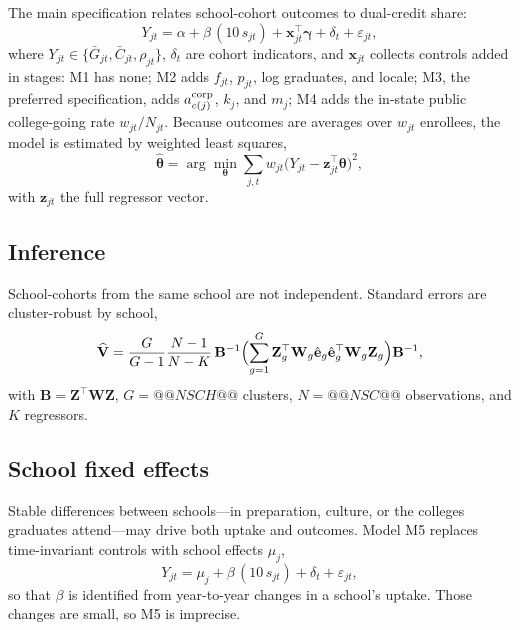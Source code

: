 \documentclass[aps,prd,reprint,superscriptaddress,nofootinbib,floatfix]{revtex4-2}
\begin{document}
The main specification relates school-cohort outcomes to dual-credit share:
\begin{equation}
Y_{jt}=\alpha+\beta\,(10\,s_{jt})+\mathbf{x}_{jt}^{\top}\boldsymbol{\gamma}+\delta_t+\varepsilon_{jt},\label{eq:main}
\end{equation}
where $Y_{jt}\in\{\bar G_{jt},\bar C_{jt},\rho_{jt}\}$, $\delta_t$ are cohort indicators, and $\mathbf{x}_{jt}$ collects controls added in stages: M1 has none; M2 adds $f_{jt}$, $p_{jt}$, log graduates, and locale; M3, the preferred specification, adds $a^{\rm corp}_{c(j)}$, $k_j$, and $m_j$; M4 adds the in-state public college-going rate $w_{jt}/N_{jt}$. Because outcomes are averages over $w_{jt}$ enrollees, the model is estimated by weighted least squares,
\begin{equation}
\hat{\boldsymbol\theta}=\arg\min_{\boldsymbol\theta}\sum_{j,t}w_{jt}\bigl(Y_{jt}-\mathbf{z}_{jt}^{\top}\boldsymbol\theta\bigr)^2,\label{eq:wls}
\end{equation}
with $\mathbf{z}_{jt}$ the full regressor vector.

\subsection{Inference}

School-cohorts from the same school are not independent. Standard errors are cluster-robust by school,
\begin{equation}
\widehat{\mathbf V}=\frac{G}{G-1}\frac{N-1}{N-K}\,\mathbf B^{-1}\Bigl(\sum_{g=1}^{G}\mathbf Z_g^{\top}\mathbf W_g\hat{\mathbf e}_g\hat{\mathbf e}_g^{\top}\mathbf W_g\mathbf Z_g\Bigr)\mathbf B^{-1},\label{eq:cluster}
\end{equation}
with $\mathbf B=\mathbf Z^{\top}\mathbf W\mathbf Z$, $G=@@NSCH@@$ clusters, $N=@@NSC@@$ observations, and $K$ regressors.

\subsection{School fixed effects}

Stable differences between schools---in preparation, culture, or the colleges graduates attend---may drive both uptake and outcomes. Model M5 replaces time-invariant controls with school effects $\mu_j$,
\begin{equation}
Y_{jt}=\mu_j+\beta\,(10\,s_{jt})+\delta_t+\varepsilon_{jt},\label{eq:fe}
\end{equation}
so that $\beta$ is identified from year-to-year changes in a school's uptake. Those changes are small, so M5 is imprecise.
\end{document}
